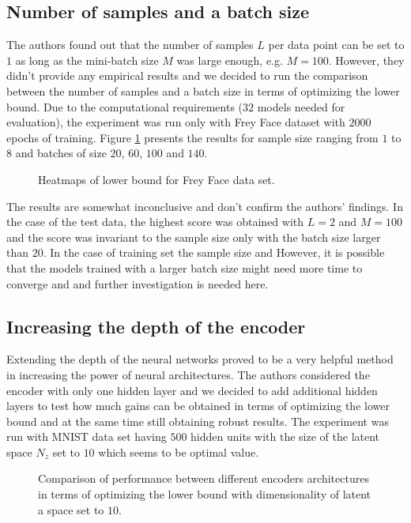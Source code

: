 \documentclass[../report.tex]{subfiles}
\begin{document}
\subsection{Number of samples and a batch size}
The authors found out that the number of samples $L$ per data point can be set to $1$ as long as the mini-batch size $M$ was large enough, e.g. $M = 100$. However, they didn't provide any empirical results and we decided to run the comparison between the number of samples and a batch size in terms of optimizing the lower bound. Due to the computational requirements ($32$ models needed for evaluation), the experiment was run only with Frey Face dataset with $2000$ epochs of training. Figure \ref{fig:heatmaps} presents the results for sample size ranging from $1$ to $8$ and batches of size $20$, $60$, $100$ and $140$.
\begin{figure}[!htb]
%
\endminipage 
{}  
\endminipage\hfill
  \caption[1]{Heatmaps of lower bound for Frey Face data set.}
  \label{fig:heatmaps}
\end{figure}

The results are somewhat inconclusive and don't confirm the authors' findings. In the case of the test data, the highest score was obtained with $L=2$ and $M=100$ and the score was invariant to the sample size only with the batch size larger than $20$. In the case of training set the sample size and
However, it is possible that the models trained with a larger batch size might need more time to converge and and further investigation is needed here.

\subsection{Increasing the depth of the encoder}
Extending the depth of the neural networks proved to be a very helpful method in increasing the power of neural architectures. The authors considered the encoder with only one hidden layer and we decided to add additional hidden layers to test how much gains can be obtained in terms of optimizing the lower bound and at the same time still obtaining robust results. The experiment was run with MNIST data set having $500$ hidden units with the size of the latent space $N_z$ set to $10$ which seems to be optimal value. 

\begin{figure}[!htb]
\centering

  \caption[1]{Comparison of performance between different encoders architectures in terms of optimizing the lower bound with dimensionality of latent a space set to $10$. }
\end{figure}
\end{document}
